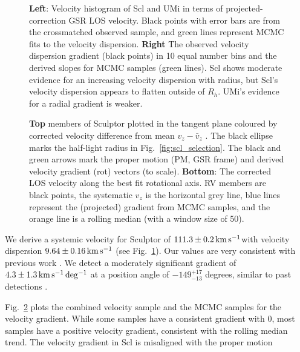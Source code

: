 \begin{figure}
\centering
{}
\caption[LOS velocity fit to Scl]{\textbf{Left}: Velocity histogram of
Scl and UMi in terms of projected-correction GSR LOS velocity. Black
points with error bars are from the crossmatched observed sample, and
green lines represent MCMC fits to the velocity dispersion.
\textbf{Right} The observed velocity dispersion gradient (black points)
in 10 equal number bins and the derived slopes for MCMC samples (green
lines). Scl shows moderate evidence for an increasing velocity
dispersion with radius, but Scl's velocity dispersion appears to flatten
outside of \(R_h\). UMi's evidence for a radial gradient is
weaker.}\label{fig:rv_hists}
\end{figure}



\begin{figure}
\centering
{}
\caption[Scl velocity gradient]{\textbf{Top} members of Sculptor plotted
in the tangent plane coloured by corrected velocity difference from mean
\(v_z - \bar v_z\) . The black ellipse marks the half-light radius in
Fig.~\ref{fig:scl_selection}. The black and green arrows mark the proper
motion (PM, GSR frame) and derived velocity gradient (rot) vectors (to
scale). \textbf{Bottom}: The corrected LOS velocity along the best fit
rotational axis. RV members are black points, the systematic \(v_z\) is
the horizontal grey line, blue lines represent the (projected) gradient
from MCMC samples, and the orange line is a rolling median (with a
window size of 50).}\label{fig:scl_velocity_gradient_scatter}
\end{figure}

We derive a systemic velocity for Sculptor of \(111.3\pm0.2\,{\rm km\,s^{-1}}\)with
velocity dispersion \(9.64\pm0.16\,{\rm km\,s^{-1}}\) (see Fig.~\ref{fig:rv_hists}).
Our values are very consistent with previous work
\citep[e.g.][\citet{arroyo-polonio+2024},
\citet{battaglia+2008}]{walker+2009}. We detect a moderately significant
gradient of \(4.3\pm1.3\,{\rm km\,s^{-1}\,deg^{-1}}\) at a position angle of
\(-149_{-13}^{+17}\) degrees, similar to past detections
\citetext{\citealp[e.g.,][]{arroyo-polonio+2024}; \citealp{battaglia+2008}; \citealp[but
see also][]{strigari2010}; \citealp{martinez-garcia+2023}}.

Fig.~\ref{fig:scl_velocity_gradient_scatter} plots the combined velocity
sample and the MCMC samples for the velocity gradient. While some
samples have a consistent gradient with 0, most samples have a positive
velocity gradient, consistent with the rolling median trend. The
velocity gradient in Scl is misaligned with the proper motion

